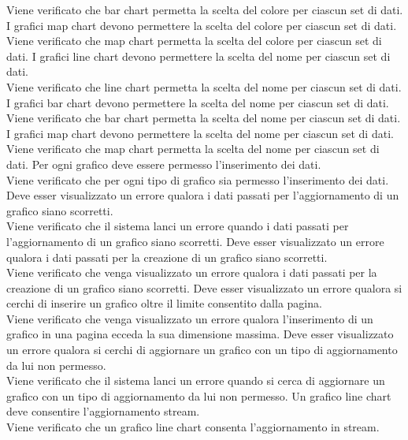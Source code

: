 Viene verificato che bar chart permetta la scelta del colore per ciascun set di dati.
 I grafici map chart devono permettere la scelta del colore per ciascun set di dati.\\
Viene verificato che map chart permetta la scelta del colore per ciascun set di dati.
	I grafici line chart devono permettere la scelta del nome per ciascun set di dati.\\
Viene verificato che line chart permetta la scelta del nome per ciascun set di dati.
	I grafici bar chart devono permettere la scelta del nome per ciascun set di dati.\\
Viene verificato che bar chart permetta la scelta del nome per ciascun set di dati.
	I grafici map chart devono permettere la scelta del nome per ciascun set di dati.\\
Viene verificato che map chart permetta la scelta del nome per ciascun set di dati.
 Per ogni grafico deve essere permesso l'inserimento dei dati.\\
Viene verificato che per ogni tipo di grafico sia permesso l'inserimento dei dati.
 Deve esser visualizzato un errore qualora i dati passati per l'aggiornamento di un grafico siano scorretti.\\
Viene verificato che il sistema lanci un errore quando i dati passati per l'aggiornamento di un grafico siano scorretti.
 Deve esser visualizzato un errore qualora i dati passati per la creazione di un grafico siano scorretti.\\
Viene verificato che venga visualizzato un errore qualora i dati passati per la creazione di un grafico siano scorretti.
 Deve esser visualizzato un errore qualora si cerchi di inserire un grafico oltre il limite consentito dalla pagina.\\
Viene verificato che venga visualizzato un errore qualora l'inserimento di un grafico in una pagina ecceda la sua dimensione massima.
 Deve esser visualizzato un errore qualora si cerchi di aggiornare un grafico con un tipo di aggiornamento da lui non permesso.\\
Viene verificato che il sistema lanci un errore quando si cerca di aggiornare un grafico con un tipo di aggiornamento da lui non permesso.
 Un grafico line chart deve consentire l'aggiornamento stream.\\
Viene verificato che un grafico line chart consenta l'aggiornamento in stream.
